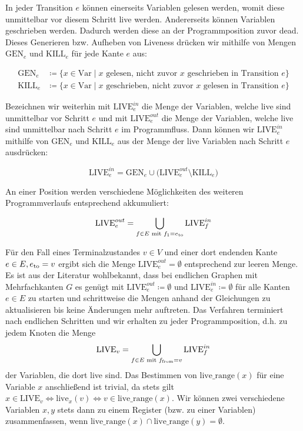 \documentclass[a4paper]{article}
\theoremstyle{nonumberplain}
\begin{document}
In jeder Transition $e$ können einerseits Variablen gelesen werden, womit diese unmittelbar vor diesem Schritt live werden. Andererseits können Variablen geschrieben werden. Dadurch werden diese an der Programmposition zuvor dead. Dieses Generieren bzw. Aufheben von Liveness drücken wir mithilfe von Mengen $\mathrm{GEN}_{e}$ und $\mathrm{KILL}_{e}$ für jede Kante $e$ aus:

\begin{align}
\mathrm{GEN}_{e} & \coloneqq \{x \in \mathrm{Var} \mid \text{$x$ gelesen, nicht zuvor $x$ geschrieben in Transition $e$} \} \nonumber \\
\mathrm{KILL}_{e} & \coloneqq \{x \in \mathrm{Var} \mid \text{$x$ geschrieben, nicht zuvor $x$ gelesen in Transition $e$} \} \nonumber
\end{align}

Bezeichnen wir weiterhin mit $\mathrm{LIVE}^{in}_{e}$ die Menge der Variablen, welche live sind unmittelbar vor Schritt $e$ und mit $\mathrm{LIVE}^{out}_{e}$ die Menge der Variablen, welche live sind unmittelbar nach Schritt $e$ im Programmfluss. Dann können wir $\mathrm{LIVE}^{in}_{e}$ mithilfe von $\mathrm{GEN}_{e}$ und $\mathrm{KILL}_{e}$ aus der Menge der live Variablen nach Schritt $e$ ausdrücken:

\begin{equation*}
\mathrm{LIVE}^{in}_{e} = \mathrm{GEN}_{e} \cup \big( \mathrm{LIVE}^{out}_{e} \setminus \mathrm{KILL}_{e} \big) 
\end{equation*}

An einer Position werden verschiedene Möglichkeiten des weiteren Programmverlaufs entsprechend akkumuliert:

\begin{equation*}
\mathrm{LIVE}^{out}_{e} = \bigcup_{f \in E \textrm{ mit } f_1 = e_{\mathrm{to}}} {\mathrm{LIVE}^{in}_{f}  }
\end{equation*}

Für den Fall eines Terminalzustandes $v \in V$ und einer dort endenden Kante $e \in E, e_{\mathrm{to}} = v$ ergibt sich die Menge $\mathrm{LIVE}^{out}_{e} = \emptyset$ entsprechend zur leeren Menge.
Es ist aus der Literatur wohlbekannt, dass bei endlichen Graphen mit Mehrfachkanten $G$ es genügt mit $\mathrm{LIVE}^{out}_{e} \coloneqq \emptyset$ und $\mathrm{LIVE}^{in}_{e} \coloneqq \emptyset$ für alle Kanten $e \in E$ zu starten und schrittweise die Mengen anhand der Gleichungen zu aktualisieren bis keine Änderungen mehr auftreten. Das Verfahren terminiert nach endlichen Schritten und wir erhalten zu jeder Programmposition, d.h. zu jedem Knoten die Menge \[
\textrm{LIVE}_v = \bigcup_{f \in E \textrm{ mit } f_{\mathrm{from}} = v} {\mathrm{LIVE}^{in}_{f}  }
\] der Variablen, die dort live sind. Das Bestimmen von $\textrm{live\_range}(x)$ für eine Variable $x$ anschließend ist trivial, da stets gilt $x \in \textrm{LIVE}_v \Leftrightarrow \textrm{live}_x(v) \Leftrightarrow v \in \textrm{live\_range}(x)$.
Wir können zwei verschiedene Variablen $x, y$ stets dann zu einem Register (bzw. zu einer Variablen) zusammenfassen, wenn $\textrm{live\_range}(x) \cap \textrm{live\_range}(y) = \emptyset $.
\end{document}
